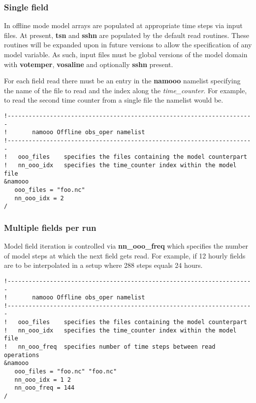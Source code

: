 \documentclass[NEMO_book]{subfiles}
\begin{document}
\subsubsection{Single field}

In offline mode model arrays are populated at appropriate time steps via input files.
At present, \textbf{tsn} and \textbf{sshn} are populated by the default read routines. 
These routines will be expanded upon in future versions to allow the specification of any
model variable. As such, input files must be global versions of the model domain with
\textbf{votemper}, \textbf{vosaline} and optionally \textbf{sshn} present.

For each field read there must be an entry in the \textbf{namooo} namelist specifying the
name of the file to read and the index along the \emph{time\_counter}. For example, to
read the second time counter from a single file the namelist would be.

\begin{alltt}
\tiny
\begin{verbatim} 
!----------------------------------------------------------------------
!       namooo Offline obs_oper namelist
!----------------------------------------------------------------------
!   ooo_files    specifies the files containing the model counterpart
!   nn_ooo_idx   specifies the time_counter index within the model file
&namooo
   ooo_files = "foo.nc"
   nn_ooo_idx = 2
/
\end{verbatim} 
\end{alltt}

\subsubsection{Multiple fields per run}

Model field iteration is controlled via \textbf{nn\_ooo\_freq} which specifies
the number of model steps at which the next field gets read. For example, if
12 hourly fields are to be interpolated in a setup where 288 steps equals 24 hours.

\begin{alltt}
\tiny
\begin{verbatim} 
!----------------------------------------------------------------------
!       namooo Offline obs_oper namelist
!----------------------------------------------------------------------
!   ooo_files    specifies the files containing the model counterpart
!   nn_ooo_idx   specifies the time_counter index within the model file
!   nn_ooo_freq  specifies number of time steps between read operations
&namooo
   ooo_files = "foo.nc" "foo.nc"
   nn_ooo_idx = 1 2
   nn_ooo_freq = 144
/
\end{verbatim} 
\end{alltt}
\end{document}
